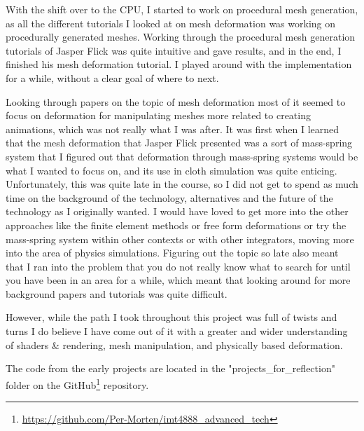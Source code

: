 With the shift over to the CPU, I started to work on procedural mesh generation, as all the different tutorials I looked at
on mesh deformation was working on procedurally generated meshes. Working through the procedural mesh generation tutorials
of Jasper Flick was quite intuitive and gave results, and in the end, I finished his mesh deformation tutorial.
I played around with the implementation for a while, without a clear goal of where to next.

Looking through papers on the topic of mesh deformation most of it seemed to focus on deformation for manipulating meshes more related to creating animations,
which was not really what I was after. 
It was first when I learned that the mesh deformation that Jasper Flick\cite{catlike_mesh_deformation} presented was a sort of mass-spring system
that I figured out that deformation through mass-spring systems would be what I wanted to focus on, and its use in cloth simulation was quite enticing.
Unfortunately, this was quite late in the course, so I did not get to spend as much time on the background of the technology, alternatives
and the future of the technology as I originally wanted.
I would have loved to get more into the other approaches like the finite element methods or free form deformations or try the mass-spring system
within other contexts or with other integrators, moving more into the area of physics simulations.
Figuring out the topic so late also meant that I ran into the problem that you do not really know what to search for until you have been in an area for a while,
which meant that looking around for more background papers and tutorials was quite difficult.

However, while the path I took throughout this project was full of twists and turns I do believe I have come out of it with a greater and wider understanding of
shaders \& rendering, mesh manipulation, and physically based deformation.

The code from the early projects are located in the "projects\_for\_reflection" folder on the GitHub\footnote{\url{https://github.com/Per-Morten/imt4888_advanced_tech}} repository.
